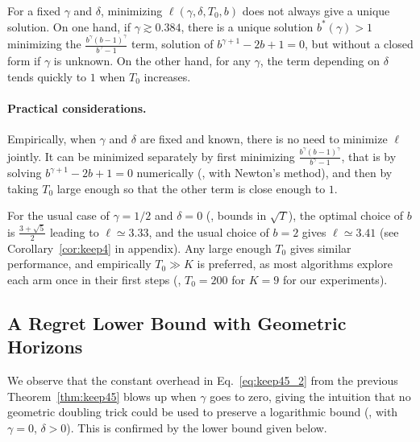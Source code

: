 \documentclass[12pt]{colt2018} %
\begin{document}
For a fixed $\gamma$ and $\delta$, minimizing $\ell(\gamma, \delta, T_0, b)$ does not always give a unique solution.
On one hand, if $\gamma \gtrsim 0.384$, there is a unique solution $b^*(\gamma) > 1$ minimizing the $\frac{b^{\gamma} (b-1)^{\gamma}}{b^{\gamma} - 1}$ term, solution of $b^{\gamma+1} - 2b + 1 = 0$, but without a closed form if $\gamma$ is unknown.
%
On the other hand, for any $\gamma$, the term depending on $\delta$ tends quickly to $1$ when $T_0$ increases.


\paragraph{Practical considerations.}
%
Empirically, when $\gamma$ and $\delta$ are fixed and known, there is no need to minimize $\ell$ jointly.
%
It can be minimized separately by first minimizing $\frac{b^{\gamma} (b-1)^{\gamma}}{b^{\gamma} - 1}$,
that is by solving $b^{\gamma+1} - 2b + 1 = 0$ numerically (\eg, with Newton's method), and then by taking $T_0$ large enough so that the other term is close enough to $1$.

For the usual case of $\gamma=1/2$ and $\delta=0$ (\ie, bounds in $\sqrt{T}$), the optimal choice of $b$ is $\frac{3+\sqrt{5}}{2}$ leading to $\ell \simeq 3.33$,
and the usual choice of $b=2$ gives $\ell \simeq 3.41$ (see Corollary~\ref{cor:keep4} in appendix).
%
Any large enough $T_0$ gives similar performance, and empirically $T_0 \gg K$ is preferred, as most algorithms explore each arm once in their first steps
(\eg, $T_0 = 200$ for $K=9$ for our experiments).


\subsection{A Regret Lower Bound with Geometric Horizons}\label{sec:lowerboundsGeom}

We observe that the constant overhead in Eq.~\eqref{eq:keep45_2} from the previous Theorem~\ref{thm:keep45} blows up when $\gamma$ goes to zero,
giving the intuition that no geometric doubling trick could be used to preserve a logarithmic bound (\ie, with $\gamma=0$, $\delta>0$).
This is confirmed by the lower bound given below.
\end{document}
